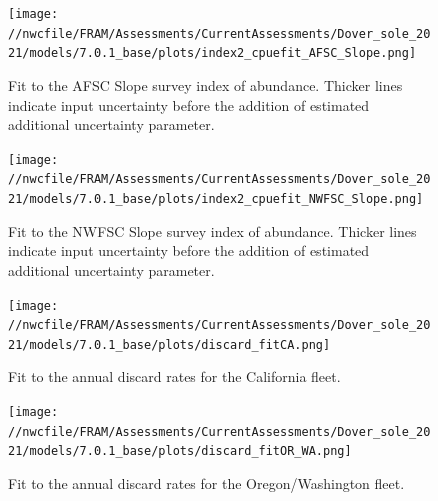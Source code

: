 \documentclass[11pt,
  english,
  a4paper,
]{article}
\begin{document}
\tagmcend\tagstructend


\begin{figure}
\centering
\texttt{[image: //nwcfile/FRAM/Assessments/CurrentAssessments/Dover\_sole\_2021/models/7.0.1\_base/plots/index2\_cpuefit\_AFSC\_Slope.png]}
\caption{Fit to the AFSC Slope survey index of abundance. Thicker lines indicate input uncertainty before the addition of estimated additional uncertainty parameter.\label{fig:afsc-index-fit}}
\end{figure}

\tagmcend\tagstructend


\begin{figure}
\centering
\texttt{[image: //nwcfile/FRAM/Assessments/CurrentAssessments/Dover\_sole\_2021/models/7.0.1\_base/plots/index2\_cpuefit\_NWFSC\_Slope.png]}
\caption{Fit to the NWFSC Slope survey index of abundance. Thicker lines indicate input uncertainty before the addition of estimated additional uncertainty parameter.\label{fig:nwslope-index-fit}}
\end{figure}

\tagmcend\tagstructend


\begin{figure}
\centering
\texttt{[image: //nwcfile/FRAM/Assessments/CurrentAssessments/Dover\_sole\_2021/models/7.0.1\_base/plots/discard\_fitCA.png]}
\caption{Fit to the annual discard rates for the California fleet.\label{fig:ca-disc-fit}}
\end{figure}

\tagmcend\tagstructend


\begin{figure}
\centering
\texttt{[image: //nwcfile/FRAM/Assessments/CurrentAssessments/Dover\_sole\_2021/models/7.0.1\_base/plots/discard\_fitOR\_WA.png]}
\caption{Fit to the annual discard rates for the Oregon/Washington fleet.\label{fig:orwa-disc-fit}}
\end{figure}
\end{document}
